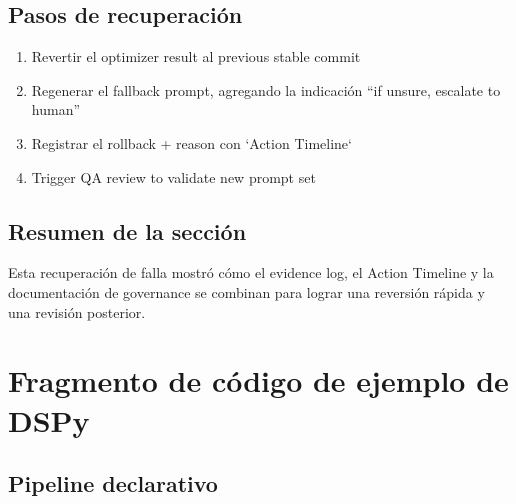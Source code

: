\documentclass[a4paper]{article}
\begin{document}
\subsection{Pasos de recuperación}

\begin{enumerate}
    \item Revertir el optimizer result al previous stable commit
    \item Regenerar el fallback prompt, agregando la indicación ``if unsure, escalate to human''
    \item Registrar el rollback + reason con `Action Timeline`
    \item Trigger QA review to validate new prompt set
\end{enumerate}

\subsection{Resumen de la sección}

Esta recuperación de falla mostró cómo el evidence log, el Action Timeline y la documentación de governance se combinan para lograr una reversión rápida y una revisión posterior.

\section{Fragmento de código de ejemplo de DSPy}

\subsection{Pipeline declarativo}
\end{document}
